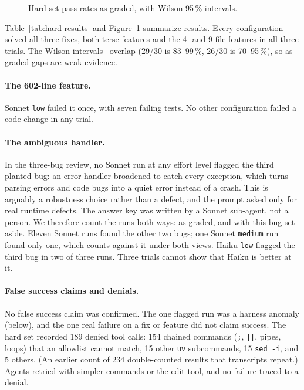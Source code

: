 \begin{figure}[H]
\centering

\caption{Hard set pass rates as graded, with Wilson 95\,\% intervals.}
\label{fig:hard-pass}
\end{figure}

Table~\ref{tab:hard-results} and Figure~\ref{fig:hard-pass} summarize results. Every configuration solved all three fixes, both terse features and the 4- and 9-file features in all three trials. The Wilson intervals~\cite{wilson1927probable} overlap (29/30 is 83--99\,\%, 26/30 is 70--95\,\%), so as-graded gaps are weak evidence.

\paragraph{The 602-line feature.} Sonnet \texttt{low} failed it once, with seven failing tests. No other configuration failed a code change in any trial.

\paragraph{The ambiguous handler.} In the three-bug review, no Sonnet run at any effort level flagged the third planted bug: an error handler broadened to catch every exception, which turns parsing errors and code bugs into a quiet error instead of a crash. This is arguably a robustness choice rather than a defect, and the prompt asked only for real runtime defects. The answer key was written by a Sonnet sub-agent, not a person. We therefore count the runs both ways: as graded, and with this bug set aside. Eleven Sonnet runs found the other two bugs; one Sonnet \texttt{medium} run found only one, which counts against it under both views. Haiku \texttt{low} flagged the third bug in two of three runs. Three trials cannot show that Haiku is better at it.

\paragraph{False success claims and denials.} No false success claim was confirmed. The one flagged run was a harness anomaly (below), and the one real failure on a fix or feature did not claim success. The hard set recorded 189 denied tool calls: 154 chained commands (\texttt{;}, \texttt{||}, pipes, loops) that an allowlist cannot match, 15 other \texttt{uv} subcommands, 15 \texttt{sed -i}, and 5 others. (An earlier count of 234 double-counted results that transcripts repeat.) Agents retried with simpler commands or the edit tool, and no failure traced to a denial.

